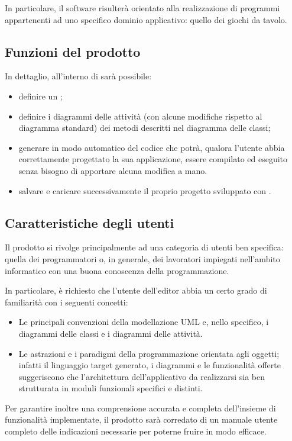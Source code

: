In particolare, il software risulterà orientato alla realizzazione di programmi appartenenti ad uno specifico dominio applicativo: quello dei giochi da tavolo.

\subsection{Funzioni del prodotto}
In dettaglio, all'interno di \proj{} sarà possibile:
\begin{itemize}
	\item definire un ;
	\item definire i diagrammi delle attività (con alcune modifiche rispetto al diagramma standard) dei metodi descritti nel diagramma delle classi;
	\item generare in modo automatico del codice che potrà, qualora l'utente abbia correttamente progettato la sua applicazione, essere compilato ed eseguito senza bisogno di apportare alcuna modifica a mano.
	\item salvare e caricare successivamente il proprio progetto sviluppato con \proj.
\end{itemize}

\subsection{Caratteristiche degli utenti}
Il prodotto \proj{} si rivolge principalmente ad una categoria di utenti ben specifica: quella dei programmatori o, in generale, dei lavoratori impiegati nell'ambito informatico con una buona conoscenza della programmazione.

In particolare, è richiesto che l'utente dell'editor abbia un certo grado di familiarità con i seguenti concetti:
\begin{itemize}
	\item Le principali convenzioni della modellazione UML e, nello specifico, i diagrammi delle classi e i diagrammi delle attività.
	\item Le astrazioni e i paradigmi della programmazione orientata agli oggetti; infatti il linguaggio target generato, i diagrammi e le funzionalità offerte suggeriscono che l'architettura dell'applicativo da realizzarsi sia ben strutturata in moduli funzionali specifici e distinti.
\end{itemize}
Per garantire inoltre una comprensione accurata e completa dell'insieme di funzionalità implementate, il prodotto sarà corredato di un manuale utente completo delle indicazioni necessarie per poterne fruire in modo efficace.

